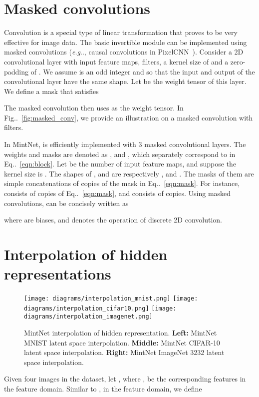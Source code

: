\documentclass{article}
\makeatletter
\def\@onedot{\ifx\@let@token.\else.\null\fi\xspace}
\DeclareRobustCommand\onedot{\futurelet\@let@token\@onedot}
\newcommand{\eqnref}[1]{Eq\onedot~\eqref{#1}}
\newcommand{\figref}[1]{Fig\onedot~\ref{#1}}
\def\eg{\emph{e.g}\onedot}
\makeatother
\begin{document}
\section{Masked convolutions}\label{app:masked_conv}
Convolution is a special type of linear transformation that proves to be very effective for image data. The basic invertible module can be implemented using masked convolutions (\eg, causal convolutions in PixelCNN~\cite{oord2016pixel}). Consider a 2D convolutional layer with  input feature maps,  filters, a kernel size of  and a zero-padding of . We assume  is an odd integer and  so that the input and output of the convolutional layer have the same shape. Let  be the weight tensor of this layer. We define a mask  that satisfies

The masked convolution then uses  as the weight tensor. In \figref{fig:masked_conv}, we provide an illustration on a  masked convolution with  filters.

In MintNet,  is efficiently implemented with 3 masked convolutional layers. The weights and masks are denoted as ,  and , which separately correspond to  in \eqnref{eqn:block}. Let  be the number of input feature maps, and suppose the kernel size is . The shapes of ,  and  are respectively ,  and . The masks of them are simple concatenations of copies of the mask in \eqnref{eqn:mask}. For instance,  consists of  copies of \eqnref{eqn:mask}, and  consists of  copies. Using masked convolutions,  can be concisely written as

where  are biases, and  denotes the operation of discrete 2D convolution.





\section{Interpolation of hidden representations}
\label{app:interpolation}
\begin{figure}[!t]
\centering
\texttt{[image: diagrams/interpolation\_mnist.png]}
\texttt{[image: diagrams/interpolation\_cifar10.png]}
\texttt{[image: diagrams/interpolation\_imagenet.png]}
\caption{MintNet interpolation of hidden representation. \textbf{Left:} MintNet MNIST latent space interpolation. \textbf{Middle:} MintNet CIFAR-10 latent space interpolation. \textbf{Right:} MintNet ImageNet 3232 latent space interpolation.}
\label{fig:interpolation}
\end{figure}
Given four images  in the dataset, let , where , be the corresponding features in the feature domain. Similar to \cite{nvp}, in the feature domain, we define
\end{document}
